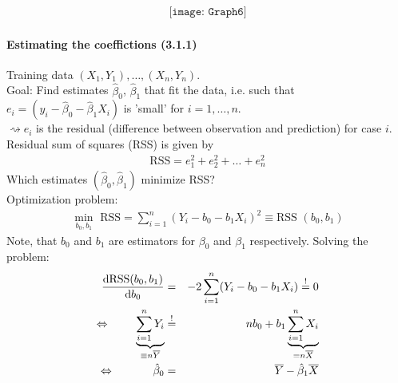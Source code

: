 \documentclass[11pt,a4paper,numbers=endperiod]{scrartcl}
\newcommand{\id}{\hspace*{4mm}}
\newcommand{\dif}{\mathrm{d}}
\begin{document}
\begin{align*}
	\texttt{[image: Graph6]}
\end{align*}

\newpage
\paragraph{Estimating the coeffictions (3.1.1)}
$ $\\

Training data $(X_1, Y_1), \ldots, (X_n, Y_n)$.\\
Goal: Find estimates $\hat{\beta}_0$, $\hat{\beta}_1$ that fit the data, i.e. such that $e_i = (y_i - \hat{\beta}_0 - \hat{\beta}_1 X_i)$ is 'small' for $i = 1, \ldots, n$.\\
 $\rightsquigarrow e_i$ is the residual (difference between observation and prediction) for case $i$.\\
Residual sum of squares (RSS) is given by \begin{align*}
	\text{RSS} = e_1^2 + e_2^2 + \ldots + e_n^2
\end{align*}
Which estimates $(\hat{\beta}_0, \hat{\beta}_1)$ minimize RSS?\\

Optimization problem: \begin{align*}
	\min\limits_{b_0, b_1} \text{ RSS} = \sum\limits_{i = 1}^n (Y_i - b_0 - b_1 X_i)^2 \equiv \text{RSS } (b_0, b_1)
\end{align*}
Note, that $b_0$ and $b_1$ are estimators for $\beta_0$ and $\beta_1$ respectively. Solving the problem: 
\begin{eqnarray*}
	\frac{\dif \text{RSS}(b_0, b_1)}{\dif b_0} &=& -2 \sum\limits_{i = 1}^n (Y_i - b_0 - b_1 X_i) \overset{!}{=} 0\\
	\Leftrightarrow \id \id \underbrace{\sum\limits_{i = 1}^n Y_i}_{\equiv n \overline{Y}} &\overset{!}{=}& n b_0 + b_1 \underbrace{\sum\limits_{i = 1}^n X_i}_{= n \overline{X}}\\
	\Leftrightarrow \id \id \id  \hat{\beta}_0 &=& \overline{Y} - \hat{\beta}_1 \overline{X}
\end{eqnarray*}
\end{document}
